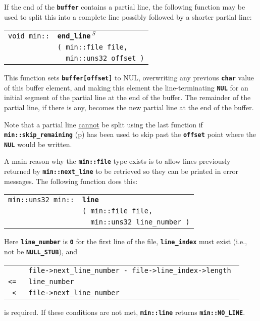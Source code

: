 \documentclass[12pt]{article}
\makeatletter
\newcommand{\TT}[1]{{\tt \bfseries #1}}
\newcommand{\ttindex}[1]{\index{#1@{\tt #1}}}
\newcommand{\pagref}[1]{p\pageref{#1}}
\newcommand{\EOL}{\penalty \exhyphenpenalty}
\newenvironment{indpar}[1][0.3in]%
	{\begin{list}{}%
		     {\setlength{\itemsep}{0in}%
		      \setlength{\topsep}{0in}%
		      \setlength{\parsep}{1ex}%
		      \setlength{\labelwidth}{#1}%
		      \setlength{\leftmargin}{#1}%
		      \addtolength{\leftmargin}{\labelsep}}%
	 \item}%
	{\end{list}}
\newcommand{\LABEL}[1]{\label{#1}}
\newlength{\ARGBREAKLENGTH}
\newcommand{\ARGBREAK}[1][\ARGBREAKLENGTH]{\\&\hspace*{#1}}
\newcommand{\MINKEY}[1]%
	   {\TT{#1}\ttindex{min::#1}\ttindex{#1}}
\newcommand{\RESIZE}{$\,^S$}
\makeatother
\begin{document}
If the end of the \TT{buffer} contains a partial line,
the following function may be used to split this into
a complete line possibly followed by a shorter partial line:

\begin{indpar}[1em]\begin{tabular}{r@{}l}
\verb|void min::|
    & \MINKEY{end\_line\RESIZE}\ARGBREAK
          \verb|( min::file file,|\ARGBREAK
	  \verb|  min::uns32 offset )|
\LABEL{MIN::END_LINE_FILE_WITH_OFFSET} \\
\end{tabular}\end{indpar}

This function sets \TT{buffer[offset]} to NUL, overwriting
any previous \TT{char} value of this buffer element, and
making this element the line-terminating \TT{NUL} for an initial segment
of the partial line at the end of the buffer.  The remainder of
the partial line, if there is any, becomes the new partial line at the
end of the buffer.

Note that a partial line \underline{cannot}\label{SKIP_REMAINING_END_LINE}
be split using the
last function if \TT{min::\EOL skip\_\EOL remaining}
(\pagref{MIN::SKIP_REMAINING}) has been used to skip past the
\TT{offset} point where the \TT{NUL} would be written.

A main reason why the \TT{min::file} type exists is to allow lines
previously returned by \TT{min::\EOL next\_\EOL line} to be retrieved
so they can be printed in error messages.
The following function does this:

\begin{indpar}[1em]\begin{tabular}{r@{}l}
\verb|min::uns32 min::|
    & \MINKEY{line}\ARGBREAK
	  \verb|( min::file file,|\ARGBREAK
	  \verb|  min::uns32 line_number )|
\LABEL{MIN::LINE_OF_FILE} \\
\end{tabular}\end{indpar}

Here \TT{line\_number} is \TT{0} for the first line of the file,
\TT{line\_index} must exist (i.e., not be \TT{NULL\_\EOL STUB}),
and
\begin{center}\begin{tabular}{rl}
       & \tt file->next\_line\_number - file->line\_index->length \\
\tt <= & \tt line\_number \\
\tt < & \tt file->next\_line\_number
\end{tabular}\end{center}
is required.  If these conditions are not met, \TT{min::\EOL line}
returns \TT{min::\EOL NO\_\EOL LINE}.
\end{document}
